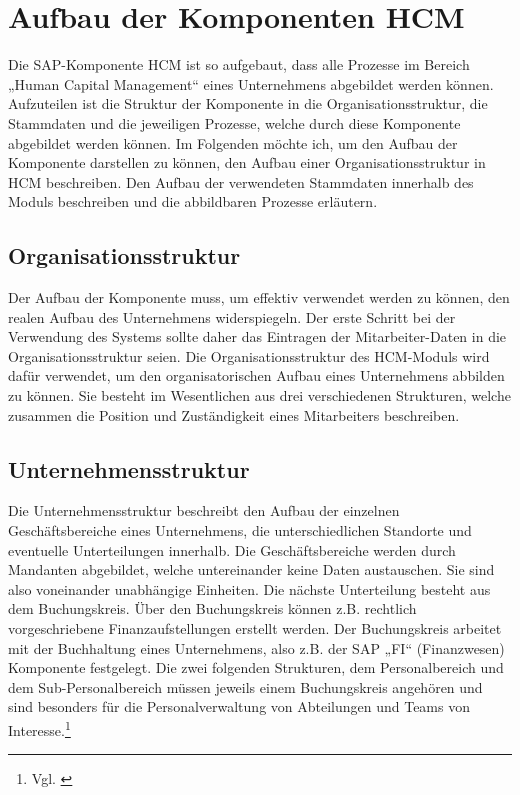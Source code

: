 
\section{Aufbau der Komponenten HCM} 
\label{sec:aufbauderkomponenten}

Die SAP-Komponente HCM ist so aufgebaut, dass alle Prozesse im Bereich „Human Capital Management“ eines Unternehmens abgebildet werden können.
Aufzuteilen ist die Struktur der Komponente in die Organisationsstruktur, die Stammdaten und die jeweiligen Prozesse, welche durch diese Komponente abgebildet werden können.
Im Folgenden möchte ich, um den Aufbau der Komponente darstellen zu können, den Aufbau einer Organisationsstruktur in HCM beschreiben.
Den Aufbau der verwendeten Stammdaten innerhalb des Moduls beschreiben und die abbildbaren Prozesse erläutern.

\subsection{Organisationsstruktur}
Der Aufbau der Komponente muss, um effektiv verwendet werden zu können, den realen Aufbau des Unternehmens widerspiegeln.
Der erste Schritt bei der Verwendung des Systems sollte daher das Eintragen der Mitarbeiter-Daten in die Organisationsstruktur seien.
Die Organisationsstruktur des HCM-Moduls wird dafür verwendet, um den organisatorischen Aufbau eines Unternehmens abbilden zu können.
Sie besteht im Wesentlichen aus drei verschiedenen Strukturen, welche zusammen die Position und Zuständigkeit eines Mitarbeiters beschreiben.

\subsection{Unternehmensstruktur}
Die Unternehmensstruktur beschreibt den Aufbau der einzelnen Geschäftsbereiche eines Unternehmens, die unterschiedlichen Standorte und eventuelle Unterteilungen innerhalb.
Die Geschäftsbereiche werden durch Mandanten abgebildet, welche untereinander keine Daten austauschen.
Sie sind also voneinander unabhängige Einheiten. Die nächste Unterteilung besteht aus dem Buchungskreis.
Über den Buchungskreis können z.B. rechtlich vorgeschriebene Finanzaufstellungen erstellt werden.
Der Buchungskreis arbeitet mit der Buchhaltung eines Unternehmens, also z.B. der SAP „FI“ (Finanzwesen) Komponente festgelegt.
Die zwei folgenden Strukturen, dem Personalbereich und dem Sub-Personalbereich müssen jeweils einem Buchungskreis angehören und sind besonders für die Personalverwaltung von Abteilungen und Teams von Interesse.\footnote{Vgl. \cite{SAPSE2024a}}

